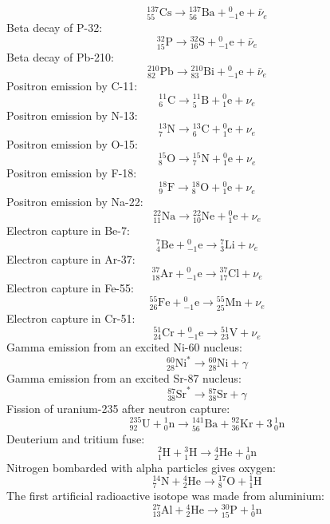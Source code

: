 \documentclass[11pt]{article}
\begin{document}
\label{eq090}\[
  {}^{137}_{55}\mathrm{Cs} \longrightarrow {}^{137}_{56}\mathrm{Ba} + {}^{0}_{-1}\mathrm{e} + \bar{\nu}_{e}
\]
Beta decay of P-32:\nopagebreak
\label{eq091}\[
  {}^{32}_{15}\mathrm{P} \longrightarrow {}^{32}_{16}\mathrm{S} + {}^{0}_{-1}\mathrm{e} + \bar{\nu}_{e}
\]
Beta decay of Pb-210:\nopagebreak
\label{eq092}\[
  {}^{210}_{82}\mathrm{Pb} \longrightarrow {}^{210}_{83}\mathrm{Bi} + {}^{0}_{-1}\mathrm{e} + \bar{\nu}_{e}
\]
Positron emission by C-11:\nopagebreak
\label{eq093}\[
  {}^{11}_{6}\mathrm{C} \longrightarrow {}^{11}_{5}\mathrm{B} + {}^{0}_{1}\mathrm{e} + \nu_{e}
\]
Positron emission by N-13:\nopagebreak
\label{eq094}\[
  {}^{13}_{7}\mathrm{N} \longrightarrow {}^{13}_{6}\mathrm{C} + {}^{0}_{1}\mathrm{e} + \nu_{e}
\]
Positron emission by O-15:\nopagebreak
\label{eq095}\[
  {}^{15}_{8}\mathrm{O} \longrightarrow {}^{15}_{7}\mathrm{N} + {}^{0}_{1}\mathrm{e} + \nu_{e}
\]
Positron emission by F-18:\nopagebreak
\label{eq096}\[
  {}^{18}_{9}\mathrm{F} \longrightarrow {}^{18}_{8}\mathrm{O} + {}^{0}_{1}\mathrm{e} + \nu_{e}
\]
Positron emission by Na-22:\nopagebreak
\label{eq097}\[
  {}^{22}_{11}\mathrm{Na} \longrightarrow {}^{22}_{10}\mathrm{Ne} + {}^{0}_{1}\mathrm{e} + \nu_{e}
\]
Electron capture in Be-7:\nopagebreak
\label{eq098}\[
  {}^{7}_{4}\mathrm{Be} + {}^{0}_{-1}\mathrm{e} \longrightarrow {}^{7}_{3}\mathrm{Li} + \nu_{e}
\]
Electron capture in Ar-37:\nopagebreak
\label{eq099}\[
  {}^{37}_{18}\mathrm{Ar} + {}^{0}_{-1}\mathrm{e} \longrightarrow {}^{37}_{17}\mathrm{Cl} + \nu_{e}
\]
Electron capture in Fe-55:\nopagebreak
\label{eq100}\[
  {}^{55}_{26}\mathrm{Fe} + {}^{0}_{-1}\mathrm{e} \longrightarrow {}^{55}_{25}\mathrm{Mn} + \nu_{e}
\]
Electron capture in Cr-51:\nopagebreak
\label{eq101}\[
  {}^{51}_{24}\mathrm{Cr} + {}^{0}_{-1}\mathrm{e} \longrightarrow {}^{51}_{23}\mathrm{V} + \nu_{e}
\]
Gamma emission from an excited Ni-60 nucleus:\nopagebreak
\label{eq102}\[
  {}^{60}_{28}\mathrm{Ni}^{*} \longrightarrow {}^{60}_{28}\mathrm{Ni} + \gamma
\]
Gamma emission from an excited Sr-87 nucleus:\nopagebreak
\label{eq103}\[
  {}^{87}_{38}\mathrm{Sr}^{*} \longrightarrow {}^{87}_{38}\mathrm{Sr} + \gamma
\]
Fission of uranium-235 after neutron capture:\nopagebreak
\label{eq104}\[
  {}^{235}_{92}\mathrm{U} + {}^{1}_{0}\mathrm{n} \longrightarrow {}^{141}_{56}\mathrm{Ba} + {}^{92}_{36}\mathrm{Kr} + 3\,{}^{1}_{0}\mathrm{n}
\]
Deuterium and tritium fuse:\nopagebreak
\label{eq105}\[
  {}^{2}_{1}\mathrm{H} + {}^{3}_{1}\mathrm{H} \longrightarrow {}^{4}_{2}\mathrm{He} + {}^{1}_{0}\mathrm{n}
\]
Nitrogen bombarded with alpha particles gives oxygen:\nopagebreak
\label{eq106}\[
  {}^{14}_{7}\mathrm{N} + {}^{4}_{2}\mathrm{He} \longrightarrow {}^{17}_{8}\mathrm{O} + {}^{1}_{1}\mathrm{H}
\]
The first artificial radioactive isotope was made from aluminium:\nopagebreak
\label{eq107}\[
  {}^{27}_{13}\mathrm{Al} + {}^{4}_{2}\mathrm{He} \longrightarrow {}^{30}_{15}\mathrm{P} + {}^{1}_{0}\mathrm{n}
\]
\end{document}

